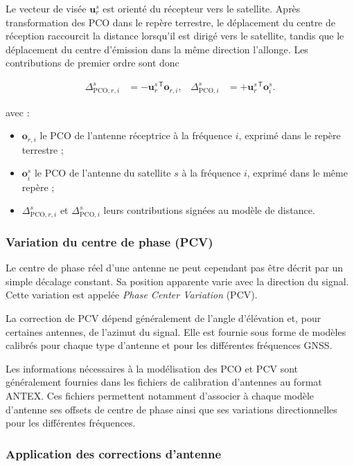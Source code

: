 Le vecteur de visée $\mathbf u_r^s$ est orienté du récepteur vers le satellite.
Après transformation des PCO dans le repère terrestre, le déplacement du
centre de réception raccourcit la distance lorsqu'il est dirigé vers le
satellite, tandis que le déplacement du centre d'émission dans la même
direction l'allonge. Les contributions de premier ordre sont donc

\begin{align}
\Delta_{\mathrm{PCO},r,i}^s
&=-\mathbf u_r^{s\,\mathsf T}\mathbf o_{r,i},
&
\Delta_{\mathrm{PCO},i}^{s}
&=+\mathbf u_r^{s\,\mathsf T}\mathbf o_i^s.
\label{eq:antenna_pco_signs}
\end{align}

avec :

\begin{itemize}
    \item $\mathbf o_{r,i}$ le PCO de l'antenne réceptrice à la fréquence
    $i$, exprimé dans le repère terrestre ;
    \item $\mathbf o_i^s$ le PCO de l'antenne du satellite $s$ à la fréquence
    $i$, exprimé dans le même repère ;
    \item $\Delta_{\mathrm{PCO},r,i}^s$ et
    $\Delta_{\mathrm{PCO},i}^{s}$ leurs contributions signées au modèle de
    distance.
\end{itemize}

\subsubsection{Variation du centre de phase (PCV)}

Le centre de phase réel d'une antenne ne peut cependant pas être décrit par un
simple décalage constant. Sa position apparente varie avec la direction du
signal. Cette variation est appelée \textit{Phase Center Variation} (PCV).

La correction de PCV dépend généralement de l'angle d'élévation et, pour
certaines antennes, de l'azimut du signal. Elle est fournie sous forme de
modèles calibrés pour chaque type d'antenne et pour les différentes fréquences
GNSS.

Les informations nécessaires à la modélisation des PCO et PCV sont
généralement fournies dans les fichiers de calibration d'antennes au format
ANTEX. Ces fichiers permettent notamment d'associer à chaque modèle d'antenne
ses offsets de centre de phase ainsi que ses variations directionnelles pour
les différentes fréquences.

\subsubsection{Application des corrections d'antenne}

